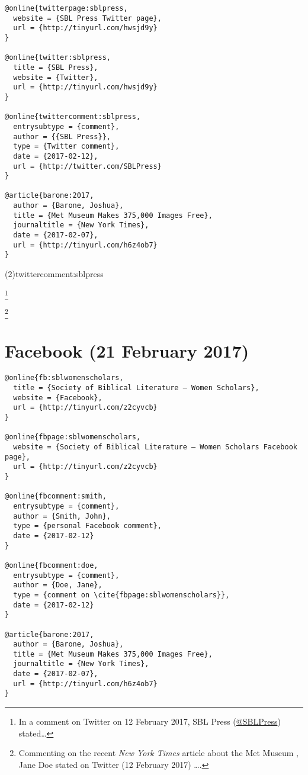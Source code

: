 \documentclass[a4paper]{article}
\begin{document}
\begin{verbatim}
@online{twitterpage:sblpress,
  website = {SBL Press Twitter page},
  url = {http://tinyurl.com/hwsjd9y}
}

@online{twitter:sblpress,
  title = {SBL Press},
  website = {Twitter},
  url = {http://tinyurl.com/hwsjd9y}
}

@online{twittercomment:sblpress,
  entrysubtype = {comment},
  author = {{SBL Press}},
  type = {Twitter comment},
  date = {2017-02-12},
  url = {http://twitter.com/SBLPress}
}

@article{barone:2017,
  author = {Barone, Joshua},
  title = {Met Museum Makes 375,000 Images Free},
  journaltitle = {New York Times},
  date = {2017-02-07},
  url = {http://tinyurl.com/h6z4ob7}
}
\end{verbatim}

\examplecite(2){twittercomment:sblpress}
\begin{fverbcite}{4}
  \footnote{In a comment on Twitter on 12 February 2017, SBL Press
  (\href{https://twitter.com/SBLPress}{@SBLPress}) stated…}
\end{fverbcite}
\begin{fverbcite}{5}
  \footnote{Commenting on the recent \emph{New York Times} article about the
  Met Museum \parencite{barone:2017}, Jane Doe stated on Twitter (12 February
  2017) ….}
\end{fverbcite}
\examplebibliography
{}

\section{Facebook (21 February 2017)}

\begin{verbatim}
@online{fb:sblwomenscholars,
  title = {Society of Biblical Literature – Women Scholars},
  website = {Facebook},
  url = {http://tinyurl.com/z2cyvcb}
}

@online{fbpage:sblwomenscholars,
  website = {Society of Biblical Literature – Women Scholars Facebook page},
  url = {http://tinyurl.com/z2cyvcb}
}

@online{fbcomment:smith,
  entrysubtype = {comment},
  author = {Smith, John},
  type = {personal Facebook comment},
  date = {2017-02-12}
}

@online{fbcomment:doe,
  entrysubtype = {comment},
  author = {Doe, Jane},
  type = {comment on \cite{fbpage:sblwomenscholars}},
  date = {2017-02-12}
}

@article{barone:2017,
  author = {Barone, Joshua},
  title = {Met Museum Makes 375,000 Images Free},
  journaltitle = {New York Times},
  date = {2017-02-07},
  url = {http://tinyurl.com/h6z4ob7}
}
\end{verbatim}
\end{document}
